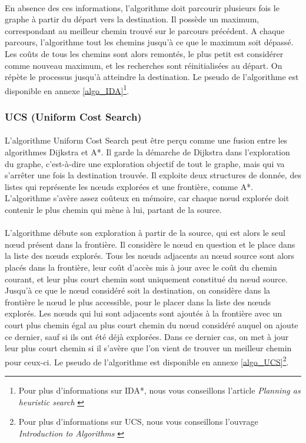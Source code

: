 \documentclass[pidr]{tnreport}
\begin{document}
\paragraph{}
En absence des ces informations, l'algorithme doit parcourir plusieurs fois le graphe à partir du départ vers la destination. Il possède un maximum, correspondant au meilleur chemin trouvé sur le parcours précédent. A chaque parcours, l'algorithme tout les chemins jusqu'à ce que le maximum soit dépassé. Les coûts de tous les chemins sont alors remontés, le plus petit est considérer comme nouveau maximum, et les recherches sont réinitialisées au départ. On répète le processus jusqu'à atteindre la destination.  
\newline\newline
Le pseudo de l'algorithme est disponible en annexe \ref{algo_IDA}\footnote{Pour plus d'informations sur IDA*, nous vous conseillons l'article \textit{Planning as heuristic search} \cite{BlaiHec}}. 

			\subsubsection{UCS (Uniform Cost Search)}
\paragraph{}			
L'algorithme Uniform Cost Search peut être perçu comme une fusion entre les algorithmes Dijkstra et A*. Il garde la démarche de Dijkstra dans l'exploration du graphe, c'est-à-dire une exploration objectif de tout le graphe, mais qui va s'arrêter une fois la destination trouvée. Il exploite deux structures de donnée, des listes qui représente les nœuds explorées et une frontière, comme A*. L'algorithme s'avère assez coûteux en mémoire, car chaque nœud explorée doit contenir le plus chemin qui mène à lui, partant de la source.  

\paragraph{}		
L'algorithme débute son exploration à partir de la source, qui est alors le seul nœud présent dans la frontière. Il considère le nœud en question et le place dans la liste des nœuds explorés. Tous les nœuds adjacents au nœud source sont alors placés dans la frontière, leur coût d'accès mis à jour avec le coût du chemin courant, et leur plus court chemin sont uniquement constitué du nœud source. Jusqu'à ce que le nœud considéré soit la destination, on considère dans la frontière le nœud le plus accessible, pour le placer dans la liste des nœuds explorés. Les nœuds qui lui sont adjacents sont ajoutés à la frontière avec un court plus chemin égal au plus court chemin du nœud considéré auquel on ajoute ce dernier, sauf si ils ont été déjà explorées. Dans ce dernier cas, on met à jour leur plus court chemin si il s'avère que l'on vient de trouver un meilleur chemin pour ceux-ci.   
\newline\newline
Le pseudo de l'algorithme est disponible en annexe \ref{algo_UCS}\footnote{Pour plus d'informations sur UCS, nous vous conseillons l'ouvrage \textit{Introduction to Algorithms} \cite{CorLeiRivSte-ita09}}.
\end{document}
